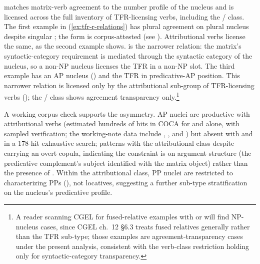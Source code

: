  matches matrix-verb agreement to the number profile of the nucleus and is licensed across the full inventory of TFR-licensing verbs, including the / class. The first example in (\ref{ex:tfr-r-relations}) has plural agreement on plural nucleus  despite singular ; the form is corpus-attested (see \autocite{kim-reynolds-2026-tfr-two-kinds}). Attributional verbs license the same, as the second example shows.  is the narrower relation: the matrix's syntactic-category requirement is mediated through the syntactic category of the nucleus, so a non-NP nucleus licenses the TFR in a non-NP slot. The third example has an AP nucleus () and the TFR in predicative-AP position. This narrower relation is licensed only by the attributional sub-group of TFR-licensing verbs (); the / class shows agreement transparency only.\footnote{A reader scanning CGEL for fused-relative examples with  or  will find NP-nucleus cases, since CGEL ch.~12 §6.3 treats fused relatives generally rather than the TFR sub-type; those examples are agreement-transparency cases under the present analysis, consistent with the verb-class restriction holding only for syntactic-category transparency.}

A working corpus check supports the asymmetry. AP nuclei are productive with attributional verbs (estimated hundreds of hits in COCA for  and  alone, with sampled verification; the working-note data include , , and ) but absent with  and  in a 178-hit exhaustive search;  patterns with the attributional class despite carrying an overt copula, indicating the constraint is on argument structure (the predicative complement's subject identified with the matrix object) rather than the presence of  \autocite{kim-reynolds-2026-tfr-two-kinds}. Within the attributional class, PP nuclei are restricted to characterizing PPs (), not locatives, suggesting a further sub-type stratification on the nucleus's predicative profile.

